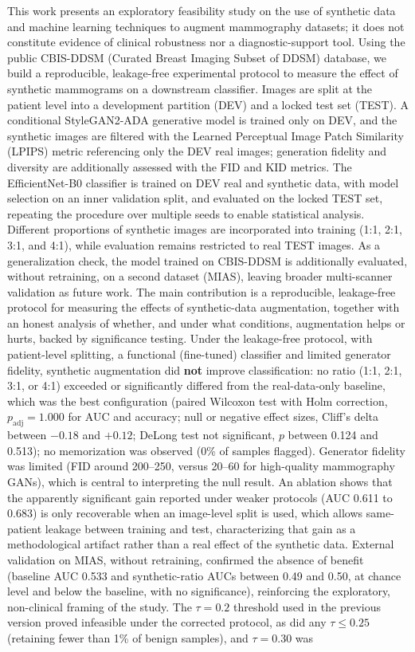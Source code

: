 \documentclass[
	12pt,				%
	openright,			%
	oneside,			%
	a4paper,			%
	tcc,			%
	]{ABNT-DC-UEL}
\begin{document}
\begin{Abstract}
 This work presents an exploratory feasibility study on the use of synthetic data and machine learning techniques to augment mammography datasets; it does not constitute evidence of clinical robustness nor a diagnostic-support tool. Using the public CBIS-DDSM (Curated Breast Imaging Subset of DDSM) database, we build a reproducible, leakage-free experimental protocol to measure the effect of synthetic mammograms on a downstream classifier. Images are split at the patient level into a development partition (DEV) and a locked test set (TEST). A conditional StyleGAN2-ADA generative model is trained only on DEV, and the synthetic images are filtered with the Learned Perceptual Image Patch Similarity (LPIPS) metric referencing only the DEV real images; generation fidelity and diversity are additionally assessed with the FID and KID metrics. The EfficientNet-B0 classifier is trained on DEV real and synthetic data, with model selection on an inner validation split, and evaluated on the locked TEST set, repeating the procedure over multiple seeds to enable statistical analysis. Different proportions of synthetic images are incorporated into training (1:1, 2:1, 3:1, and 4:1), while evaluation remains restricted to real TEST images. As a generalization check, the model trained on CBIS-DDSM is additionally evaluated, without retraining, on a second dataset (MIAS), leaving broader multi-scanner validation as future work. The main contribution is a reproducible, leakage-free protocol for measuring the effects of synthetic-data augmentation, together with an honest analysis of whether, and under what conditions, augmentation helps or hurts, backed by significance testing. Under the leakage-free protocol, with patient-level splitting, a functional (fine-tuned) classifier and limited generator fidelity, synthetic augmentation did \textbf{not} improve classification: no ratio (1:1, 2:1, 3:1, or 4:1) exceeded or significantly differed from the real-data-only baseline, which was the best configuration (paired Wilcoxon test with Holm correction, $p_{\text{adj}} = 1.000$ for AUC and accuracy; null or negative effect sizes, Cliff's delta between $-0.18$ and $+0.12$; DeLong test not significant, $p$ between 0.124 and 0.513); no memorization was observed (0\% of samples flagged). Generator fidelity was limited (FID around 200--250, versus 20--60 for high-quality mammography GANs), which is central to interpreting the null result. An ablation shows that the apparently significant gain reported under weaker protocols (AUC 0.611 to 0.683) is only recoverable when an image-level split is used, which allows same-patient leakage between training and test, characterizing that gain as a methodological artifact rather than a real effect of the synthetic data. External validation on MIAS, without retraining, confirmed the absence of benefit (baseline AUC 0.533 and synthetic-ratio AUCs between 0.49 and 0.50, at chance level and below the baseline, with no significance), reinforcing the exploratory, non-clinical framing of the study. The $\tau = 0.2$ threshold used in the previous version proved infeasible under the corrected protocol, as did any $\tau \le 0.25$ (retaining fewer than 1\% of benign samples), and $\tau = 0.30$ was 
\end{Abstract}
\end{document}

